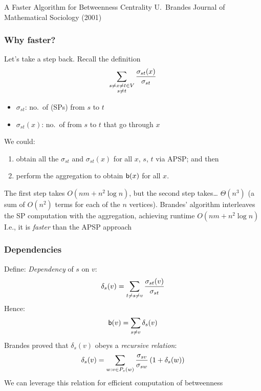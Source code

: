 \begin{frame}
  \centering
  \vfill
  {\huge A Faster Algorithm for Betweenness Centrality}
  \vfill
  {\Large U.~Brandes}
  \vfill
  {\large Journal of Mathematical Sociology (2001)}
  \vfill
\end{frame}

\begin{frame}
  \frametitle{Why {\red faster}?}
  \vfill
  Let's take a step back. Recall the definition
  \[
    \sum_{\substack{s\neq x\neq t \in V\\s\neq t}}\frac{\sigma_{st}(x)}{\sigma_{st}}
    \vspace{-10pt}
  \]
  \begin{itemize}
    \item $\sigma_{st}$: no.~of \spath (SPs) from $s$ to $t$
    \item $\sigma_{st}(x)$: no.~of \spath from $s$ to $t$ that go through $x$
  \end{itemize}
  \pause
  We could:
  \begin{enumerate}
    \item obtain all the $\sigma_{st}$ and $\sigma_{st}(x)$ for all $x$, $s$,
      $t$ via APSP; and then
    \item perform the aggregation to obtain $\mathsf{b}(x)$ for all $x$.
  \end{enumerate}
  \pause
  The first step takes $O(nm+n^2\log n)$, but the second step takes\ldots\pause
  $\Theta(n^3)$ (a sum of $O(n^2)$ terms for each of the $n$ vertices).
  \pause
  \vfill
  Brandes' algorithm interleaves the SP computation with the aggregation,
  achieving runtime $O(nm+n^2\log n)$\\
  \quad I.e., it is \emph{faster} than the APSP approach
\end{frame}

\begin{frame}
  \frametitle{Dependencies}
  Define: \emph{Dependency} of $s$ on $v$:
  \[
    \delta_s(v)=\sum_{t\neq s\neq v}\frac{\sigma_{st}(v)}{\sigma_{st}}
  \]
  Hence:
  \[
    \mathsf{b}(v)=\sum_{s\neq v}\delta_s(v)
  \]
  \pause
  Brandes proved that $\delta_s(v)$ obeys a \emph{recursive relation}:
  \[
    \delta_s(v)=\sum_{w:v\in P_s(w)}\frac{\sigma_{sv}}{\sigma_{sw}}\left(1+\delta_s(w)\right)
  \]
  We can leverage this relation for efficient computation of betweenness
\end{frame}

